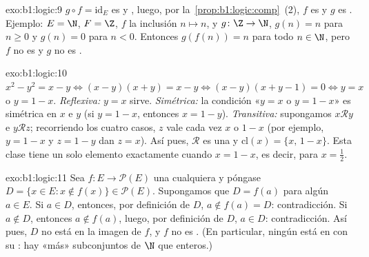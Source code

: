 \begin{solution}{exo:b1:logic:9}
$g \circ f = \mathrm{id}_E$ es  y , luego, por
la~\cref{prop:b1:logic:comp}~(2), $f$ es  y $g$ es .
Ejemplo: $E = \N$, $F = \Z$, $f$ la inclusión $n \mapsto n$, y
$g \colon \Z \to \N$, $g(n) = n$ para $n \geq 0$ y $g(n) = 0$ para
$n < 0$. Entonces $g(f(n)) = n$ para todo $n \in \N$, pero $f$ no es
 y $g$ no es .
\end{solution}

\begin{solution}{exo:b1:logic:10}
$x^2 - y^2 = x - y \iff (x - y)(x + y) = x - y \iff (x - y)(x + y - 1)
= 0 \iff y = x$ o $y = 1 - x$. \emph{Reflexiva:} $y = x$ sirve.
\emph{Simétrica:} la condición «$y = x$ o $y = 1 - x$» es simétrica en
$x$ e $y$ (si $y = 1 - x$, entonces $x = 1 - y$).
\emph{Transitiva:} supongamos $x \mathbin{\mathcal{R}} y$ e $y
\mathbin{\mathcal{R}} z$; recorriendo los cuatro casos, $z$ vale cada
vez $x$ o $1 - x$ (por ejemplo, $y = 1 - x$ y $z = 1 - y$ dan $z = x$).
Así pues, $\mathcal{R}$ es una  y
$\mathrm{cl}(x) = \{x,\, 1 - x\}$. Esta clase tiene un solo elemento
exactamente cuando $x = 1 - x$, es decir, para $x = \frac12$.
\end{solution}

\begin{solution}{exo:b1:logic:11}
Sea $f \colon E \to \mathcal{P}(E)$ una  cualquiera y
póngase $D = \{x \in E : x \notin f(x)\} \in \mathcal{P}(E)$.
Supongamos que $D = f(a)$ para algún $a \in E$. Si $a \in D$, entonces,
por definición de $D$, $a \notin f(a) = D$: contradicción. Si
$a \notin D$, entonces $a \notin f(a)$, luego, por definición de $D$,
$a \in D$: contradicción. Así pues, $D$ no está en la imagen de $f$, y
$f$ no es . (En particular, ningún  está en
 con su : hay «más» subconjuntos de
$\N$ que enteros.)
\end{solution}

